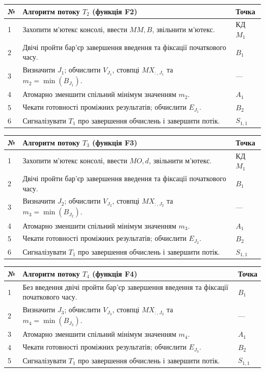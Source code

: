 \documentclass[12pt,a4paper]{article}
\begin{document}
\begin{longtable}{|p{0.9cm}|p{11.2cm}|p{2.2cm}|}
\hline
\textbf{№} & \textbf{Алгоритм потоку $T_2$ (функція F2)} & \textbf{Точка}\\ \hline
1 & Захопити м’ютекс консолі, ввести $MM,B$, звільнити м’ютекс. & КД $M_1$\\ \hline
2 & Двічі пройти бар’єр завершення введення та фіксації початкового часу. & $B_1$\\ \hline
3 & Визначити $J_1$; обчислити $V_{J_1}$, стовпці $MX_{:,J_1}$ та $m_2=\min(B_{J_1})$. & ---\\ \hline
4 & Атомарно зменшити спільний мінімум значенням $m_2$. & $A_1$\\ \hline
5 & Чекати готовності проміжних результатів; обчислити $E_{J_1}$. & $B_2$\\ \hline
6 & Сигналізувати $T_1$ про завершення обчислень і завершити потік. & $S_{1,1}$\\ \hline
\end{longtable}

\begin{longtable}{|p{0.9cm}|p{11.2cm}|p{2.2cm}|}
\hline
\textbf{№} & \textbf{Алгоритм потоку $T_3$ (функція F3)} & \textbf{Точка}\\ \hline
1 & Захопити м’ютекс консолі, ввести $MO,d$, звільнити м’ютекс. & КД $M_1$\\ \hline
2 & Двічі пройти бар’єр завершення введення та фіксації початкового часу. & $B_1$\\ \hline
3 & Визначити $J_2$; обчислити $V_{J_2}$, стовпці $MX_{:,J_2}$ та $m_3=\min(B_{J_2})$. & ---\\ \hline
4 & Атомарно зменшити спільний мінімум значенням $m_3$. & $A_1$\\ \hline
5 & Чекати готовності проміжних результатів; обчислити $E_{J_2}$. & $B_2$\\ \hline
6 & Сигналізувати $T_1$ про завершення обчислень і завершити потік. & $S_{1,1}$\\ \hline
\end{longtable}

\begin{longtable}{|p{0.9cm}|p{11.2cm}|p{2.2cm}|}
\hline
\textbf{№} & \textbf{Алгоритм потоку $T_4$ (функція F4)} & \textbf{Точка}\\ \hline
1 & Без введення двічі пройти бар’єр завершення введення та фіксації початкового часу. & $B_1$\\ \hline
2 & Визначити $J_3$; обчислити $V_{J_3}$, стовпці $MX_{:,J_3}$ та $m_4=\min(B_{J_3})$. & ---\\ \hline
3 & Атомарно зменшити спільний мінімум значенням $m_4$. & $A_1$\\ \hline
4 & Чекати готовності проміжних результатів; обчислити $E_{J_3}$. & $B_2$\\ \hline
5 & Сигналізувати $T_1$ про завершення обчислень і завершити потік. & $S_{1,1}$\\ \hline
\end{longtable}
\end{document}
